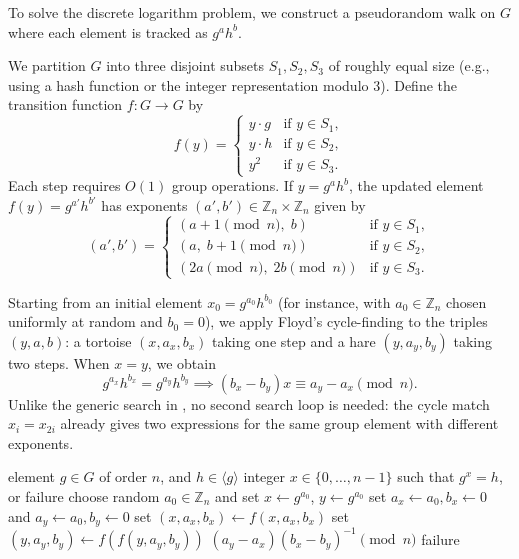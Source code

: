 To solve the discrete logarithm problem, we construct a pseudorandom walk on \(G\) where each element is tracked as \(g^a h^b\).

We partition \(G\) into three disjoint subsets \(S_1, S_2, S_3\) of roughly equal size (e.g., using a hash function or the integer representation modulo \(3\)).
Define the transition function \(f \colon G \to G\) by
\[
    f(y) =
    \begin{cases}
        y \cdot g & \text{if } y \in S_1, \\
        y \cdot h & \text{if } y \in S_2, \\
        y^2       & \text{if } y \in S_3.
    \end{cases}
\]
Each step requires \(O(1)\) group operations.
If \(y = g^a h^b\), the updated element \(f(y) = g^{a'} h^{b'}\) has exponents \((a', b') \in \mathbb{Z}_n \times \mathbb{Z}_n\) given by
\[
    (a', b') =
    \begin{cases}
        (a + 1 \pmod{n}, \; b)          & \text{if } y \in S_1, \\
        (a, \; b + 1 \pmod{n})          & \text{if } y \in S_2, \\
        (2a \pmod{n}, \; 2b \pmod{n})    & \text{if } y \in S_3.
    \end{cases}
\]

Starting from an initial element \(x_0 = g^{a_0} h^{b_0}\) (for instance, with \(a_0 \in \mathbb{Z}_n\) chosen uniformly at random and \(b_0 = 0\)), we apply Floyd's cycle-finding to the triples \((y, a, b)\):
a tortoise \((x, a_x, b_x)\) taking one step and a hare \((y, a_y, b_y)\) taking two steps.
When \(x = y\), we obtain
\[
    g^{a_x} h^{b_x} = g^{a_y} h^{b_y} \implies (b_x - b_y) x \equiv a_y - a_x \pmod{n}.
\]
Unlike the generic search in , no second search loop is needed: the cycle match \(x_i = x_{2i}\) already gives two expressions for the same group element with different exponents.

\begin{algorithm}[H]
    \caption{Pollard's Rho Algorithm for Discrete Logarithm}\label{alg:pollard-rho}
    \begin{algorithmic}[1]
        \Input element \(g \in G\) of order \(n\), and \(h \in \langle g \rangle\)
        \Output integer \(x \in \{0, \dots, n-1\}\) such that \(g^x = h\), or \textup{failure}
        \State choose random \(a_0 \in \mathbb{Z}_n\) and set \(x \gets g^{a_0}\), \(y \gets g^{a_0}\)
        \State set \(a_x \gets a_0, b_x \gets 0\) and \(a_y \gets a_0, b_y \gets 0\)
        \Repeat
            \State set \((x, a_x, b_x) \gets f(x, a_x, b_x)\) 
            \State set \((y, a_y, b_y) \gets f(f(y, a_y, b_y))\) 
            \State \Return \((a_y - a_x)(b_x - b_y)^{-1} \pmod{n}\)
        \Else
            \State \Return \textup{failure} 
        \EndIf
    \end{algorithmic}
\end{algorithm}

